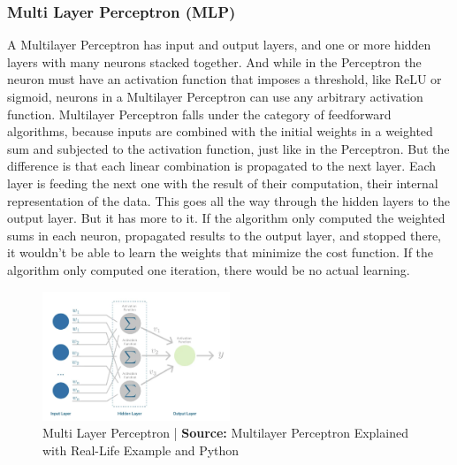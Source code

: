 \documentclass{article}
\begin{document}


\subsubsection{Multi Layer Perceptron (MLP)}

A Multilayer Perceptron has input and output layers, and one or more hidden layers with many neurons stacked together. And while in the Perceptron the neuron must have an activation function that imposes a threshold, like ReLU or sigmoid, neurons in a Multilayer Perceptron can use any arbitrary activation function.
Multilayer Perceptron falls under the category of feedforward algorithms, because inputs are combined with the initial weights in a weighted sum and subjected to the activation function, just like in the Perceptron. But the difference is that each linear combination is propagated to the next layer.
Each layer is feeding the next one with the result of their computation, their internal representation of the data. This goes all the way through the hidden layers to the output layer.
But it has more to it.
If the algorithm only computed the weighted sums in each neuron, propagated results to the output layer, and stopped there, it wouldn’t be able to learn the weights that minimize the cost function. If the algorithm only computed one iteration, there would be no actual learning.

\begin{figure}[H]
    \centering
    \includegraphics[width=0.5\textwidth]{images/MLP.png}
    \caption{Multi Layer Perceptron | \textbf{Source:} Multilayer Perceptron Explained with Real-Life Example and Python} 

\end{figure}
\end{document}
